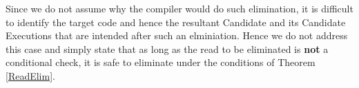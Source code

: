     Since we do not assume why the compiler would do such elimination, it is difficult to identify the target code and hence the resultant Candidate and its Candidate Executions that are intended after such an elminiation. 
    Hence we do not address this case and simply state that as long as the read to be eliminated is \textbf{not} a conditional check, it is safe to eliminate under the conditions of Theorem \ref{ReadElim}. 
    